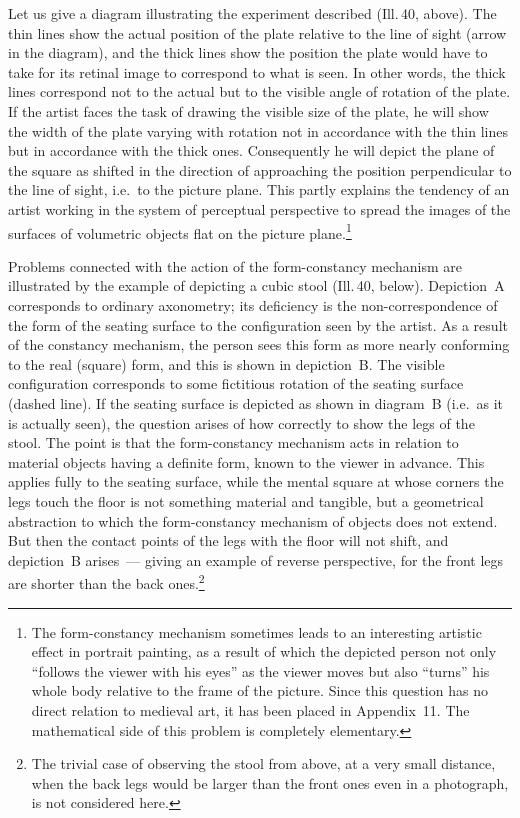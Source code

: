 
Let us give a diagram illustrating the experiment described (Ill.\,40, above).  The
thin lines show the actual position of the plate relative to the line of sight (arrow
in the diagram), and the thick lines show the position the plate would have to take
for its retinal image to correspond to what is seen.  In other words, the thick lines
correspond not to the actual but to the visible angle of rotation of the plate.  If
the artist faces the task of drawing the visible size of the plate, he will show the
width of the plate varying with rotation not in accordance with the thin lines but in
accordance with the thick ones.  Consequently he will depict the plane of the square
as shifted in the direction of approaching the position perpendicular to the line of
sight, i.e.\ to the picture plane.  This partly explains the tendency of an artist
working in the system of perceptual perspective to spread the images of the surfaces
of volumetric objects flat on the picture plane.\footnote{The form-constancy
  mechanism sometimes leads to an interesting artistic effect in portrait painting, as
  a result of which the depicted person not only ``follows the viewer with his eyes''
  as the viewer moves but also ``turns'' his whole body relative to the frame of the
  picture.  Since this question has no direct relation to medieval art, it has been
  placed in Appendix~11.  The mathematical side of this problem is completely
  elementary.}

Problems connected with the action of the form-constancy mechanism are illustrated by
the example of depicting a cubic stool (Ill.\,40, below).  Depiction~A corresponds to
ordinary axonometry; its deficiency is the non-correspondence of the form of the
seating surface to the configuration seen by the artist.  As a result of the
constancy mechanism, the person sees this form as more nearly conforming to the real
(square) form, and this is shown in depiction~B.  The visible configuration
corresponds to some fictitious rotation of the seating surface (dashed line).  If the
seating surface is depicted as shown in diagram~B (i.e.\ as it is actually seen), the
question arises of how correctly to show the legs of the stool.  The point is that
the form-constancy mechanism acts in relation to material objects having a definite
form, known to the viewer in advance.  This applies fully to the seating surface,
while the mental square at whose corners the legs touch the floor is not something
material and tangible, but a geometrical abstraction to which the form-constancy
mechanism of objects does not extend.  But then the contact points of the legs with
the floor will not shift, and depiction~B arises~--- giving an example of reverse
perspective, for the front legs are shorter than the back ones.\footnote{The trivial
  case of observing the stool from above, at a very small distance, when the back
  legs would be larger than the front ones even in a photograph, is not considered
  here.}

